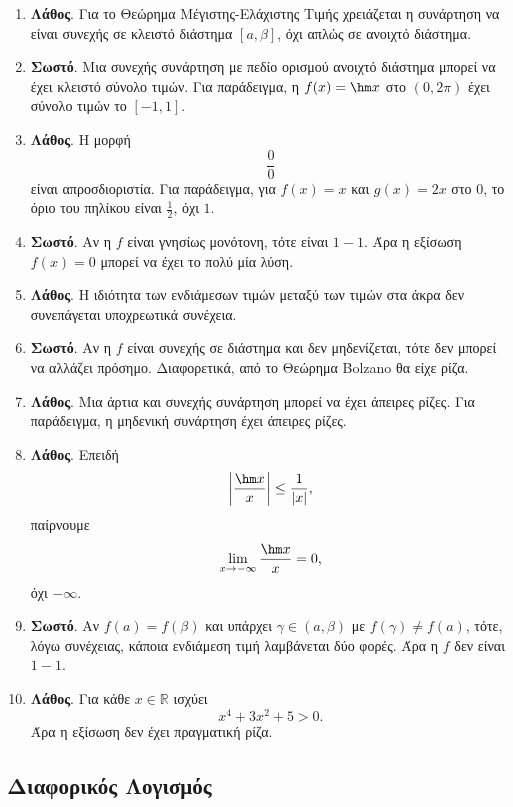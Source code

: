 \begin{enumerate}[label=\textbf{1.\arabic*.}]
\item \textbf{Λάθος}. Για το Θεώρημα Μέγιστης-Ελάχιστης Τιμής χρειάζεται η συνάρτηση να είναι συνεχής σε κλειστό διάστημα $[a,\beta]$, όχι απλώς σε ανοιχτό διάστημα.

\item \textbf{Σωστό}. Μια συνεχής συνάρτηση με πεδίο ορισμού ανοιχτό διάστημα μπορεί να έχει κλειστό σύνολο τιμών. Για παράδειγμα, η $f(x)=\hm x$ στο $(0,2\pi)$ έχει σύνολο τιμών το $[-1,1]$.

\item \textbf{Λάθος}. Η μορφή
\[
\frac{0}{0}
\]
είναι απροσδιοριστία. Για παράδειγμα, για $f(x)=x$ και $g(x)=2x$ στο $0$, το όριο του πηλίκου είναι $\frac12$, όχι $1$.

\item \textbf{Σωστό}. Αν η $f$ είναι γνησίως μονότονη, τότε είναι $1-1$. Άρα η εξίσωση $f(x)=0$ μπορεί να έχει το πολύ μία λύση.

\item \textbf{Λάθος}. Η ιδιότητα των ενδιάμεσων τιμών μεταξύ των τιμών στα άκρα δεν συνεπάγεται υποχρεωτικά συνέχεια.

\item \textbf{Σωστό}. Αν η $f$ είναι συνεχής σε διάστημα και δεν μηδενίζεται, τότε δεν μπορεί να αλλάζει πρόσημο. Διαφορετικά, από το Θεώρημα Bolzano θα είχε ρίζα.

\item \textbf{Λάθος}. Μια άρτια και συνεχής συνάρτηση μπορεί να έχει άπειρες ρίζες. Για παράδειγμα, η μηδενική συνάρτηση έχει άπειρες ρίζες.

\item \textbf{Λάθος}. Επειδή
\[
\left|\frac{\hm x}{x}\right|\leq \frac{1}{|x|},
\]
παίρνουμε
\[
\lim_{x\to-\infty}\frac{\hm x}{x}=0,
\]
όχι $-\infty$.

\item \textbf{Σωστό}. Αν $f(a)=f(\beta)$ και υπάρχει $\gamma\in(a,\beta)$ με $f(\gamma)\neq f(a)$, τότε, λόγω συνέχειας, κάποια ενδιάμεση τιμή λαμβάνεται δύο φορές. Άρα η $f$ δεν είναι $1-1$.

\item \textbf{Λάθος}. Για κάθε $x\in\mathbb{R}$ ισχύει
\[
x^4+3x^2+5>0.
\]
Άρα η εξίσωση δεν έχει πραγματική ρίζα.
\end{enumerate}

\subsection{Διαφορικός Λογισμός}

